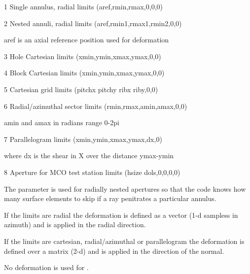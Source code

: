 \documentclass[letterpaper,10pt,english]{sphinxmanual}
\begin{document}
\begin{fulllineitems}
\begin{quote}
\begin{description}
\end{description}\end{quote}
\begin{description}
\item[{ values:}] \leavevmode
\begin{DUlineblock}{0em}
\item[] 1 Single annulus, radial limits (aref,rmin,rmax,0,0,0)
\item[] 2 Nested annuli, radial limits  (aref,rmin1,rmax1,rmin2,0,0)
\item[]
\begin{DUlineblock}{\DUlineblockindent}
\item[] aref is an axial reference position used for deformation
\end{DUlineblock}
\item[] 3 Hole Cartesian limits (xmin,ymin,xmax,ymax,0,0)
\item[] 4 Block Cartesian limits (xmin,ymin,xmax,ymax,0,0)
\item[] 5 Cartesian grid limits (pitchx pitchy ribx riby,0,0)
\item[] 6 Radial/azimuthal sector limits (rmin,rmax,amin,amax,0,0)
\item[]
\begin{DUlineblock}{\DUlineblockindent}
\item[] amin and amax in radians range 0-2pi
\end{DUlineblock}
\item[] 7 Parallelogram limits (xmin,ymin,xmax,ymax,dx,0)
\item[]
\begin{DUlineblock}{\DUlineblockindent}
\item[] where dx is the shear in X over the distance ymax-ymin
\end{DUlineblock}
\item[] 8 Aperture for MCO test station limits (hsize dols,0,0,0,0)
\end{DUlineblock}

\end{description}

The parameter  is used for radially nested apertures so that
the code knows how many surface elements to skip if a ray penitrates
a particular annulus.

If the limits are radial the deformation is defined as a vector (1-d
sampless in azimuth) and is applied in the radial direction.

If the limits are cartesian, radial/azimuthal or parallelogram
the deformation is defined over a matrix (2-d) and is applied in the
direction of the normal.

No deformation is used for .

\end{fulllineitems}
\end{document}
